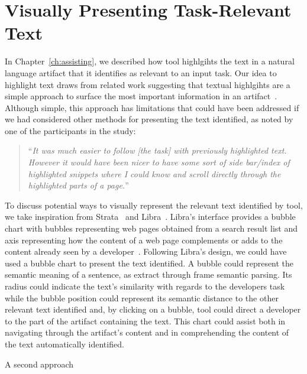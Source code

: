 




\section{Visually Presenting Task-Relevant Text}
\label{cp7:info-viz}




In Chapter~\ref{ch:assisting}, we described how \acs{tool}
highlgihts the text in a natural language artifact that it identifies 
as relevant to an input task. Our idea to highlight text 
draws from related work suggesting that textual highlgihts 
are a simple approach to surface the most important information in 
an artifact~\cite{Robillard2015,nadi2020}. 
Although simple, this approach has limitations that could have been 
addressed if we had considered other methods for presenting the text identified,
as noted by one of the participants in the study:




\smallskip
\begin{footnotesize}
\begin{quote}
``\textit{It was much easier to follow [the task] with previously highlighted text.  
    However it would have been nicer to have some sort of side bar/index of highlighted snippets
    where I could know and scroll directly through the highlighted parts of a page.}''
\end{quote}
\end{footnotesize}


\smallskip
To discuss potential ways to visually represent the 
relevant text identified by \acs{tool}, we take inspiration from Strata~\cite{liu2021} and Libra~\cite{Ponzanelli2017}.
Libra's interface provides a bubble chart with bubbles representing 
web pages obtained from a search result list and axis representing 
how the content of a web page complements or adds to the content 
already seen by a developer~\cite{Ponzanelli2017}.
Following Libra's design, 
we could have used a bubble chart to present the text identified. 
A bubble could represent the semantic meaning of a sentence, as extract through frame semantic parsing.
Its radius could indicate the text's similarity with regards to the developers task
while the bubble position could represent its semantic
distance to the other relevant text identified and, by clicking on a bubble, 
\acs{tool} could direct a developer to the part of the artifact containing 
the text. This chart could assist both in navigating through the artifact's content 
and in comprehending the content of the text automatically identified.


A second approach 



